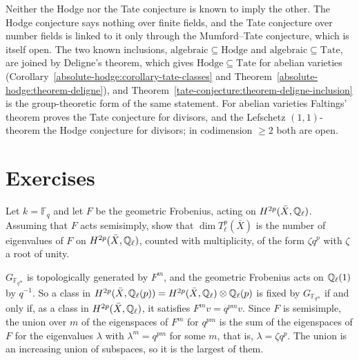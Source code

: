 \begin{remark}\label{tate-conjecture:remark-hodge-versus-tate}
Neither the Hodge nor the Tate conjecture is known to imply the other. The Hodge conjecture says nothing over finite fields, and the Tate conjecture over number fields is linked to it only through the
Mumford--Tate conjecture, which is itself open. The two known inclusions, $\mathrm{algebraic} \subseteq \mathrm{Hodge}$ and $\mathrm{algebraic} \subseteq \mathrm{Tate}$, are joined by Deligne's theorem, which gives
$\mathrm{Hodge} \subseteq \mathrm{Tate}$ for abelian varieties (Corollary~\ref{absolute-hodge:corollary-tate-classes} and Theorem~\ref{absolute-hodge:theorem-deligne}), and Theorem~\ref{tate-conjecture:theorem-deligne-inclusion}
is the group-theoretic form of the same statement. For abelian varieties Faltings' theorem proves the Tate conjecture for divisors, and the Lefschetz $(1,1)$-theorem the Hodge conjecture for
divisors; in codimension $\geq 2$ both are open.
\end{remark}

\section{Exercises}\label{tate-conjecture:section-exercises}

\begin{exercise}\label{tate-conjecture:exercise-frobenius}
Let $k = \mathbb{F}_q$ and let $F$ be the geometric Frobenius, acting on $H^{2p}(\bar X, \mathbb{Q}_\ell)$. Assuming that $F$ acts semisimply, show that $\dim T^p_\ell(\bar X)$ is the number of eigenvalues of $F$ on
$H^{2p}(\bar X, \mathbb{Q}_\ell)$, counted with multiplicity, of the form $\zeta q^p$ with $\zeta$ a root of unity.
\end{exercise}

\begin{solution}
$G_{\mathbb{F}_{q^m}}$ is topologically generated by $F^m$, and the geometric Frobenius acts on $\mathbb{Q}_\ell(1)$ by $q^{-1}$. So a class in $H^{2p}(\bar X, \mathbb{Q}_\ell(p)) = H^{2p}(\bar X, \mathbb{Q}_\ell) \otimes \mathbb{Q}_\ell(p)$ is fixed by
$G_{\mathbb{F}_{q^m}}$ if and only if, as a class in $H^{2p}(\bar X, \mathbb{Q}_\ell)$, it satisfies $F^mv = q^{pm}v$. Since $F$ is semisimple, the union over $m$ of the eigenspaces of $F^m$ for $q^{pm}$ is the sum of the
eigenspaces of $F$ for the eigenvalues $\lambda$ with $\lambda^m = q^{pm}$ for some $m$, that is, $\lambda = \zeta q^p$. The union is an increasing union of subspaces, so it is the largest of them.
\end{solution}

